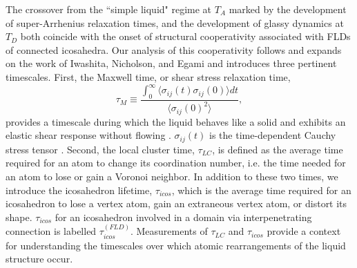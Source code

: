 \documentclass[aps,prl,preprint,showpacs,amsmath,floatfix,superscriptaddress]{revtex4}
\begin{document}
The crossover from the ``simple liquid" regime at $T_{A}$ marked
by the development of super-Arrhenius relaxation times, and the
development of glassy dynamics at $T_{D}$ both coincide with the
onset of structural cooperativity associated with FLDs of
connected icosahedra. Our analysis of this cooperativity follows
and expands on the work of Iwashita, Nicholson, and Egami
\cite{Iwashita2013} and introduces three pertinent timescales.
First, the Maxwell time, or shear stress relaxation time,
\begin{equation}\label{eq:maxwell} \tau_{M} \equiv \frac{ \int_{0}^{\infty} \langle\sigma_{ij}(t)\sigma_{ij}(0)\rangle dt }{\langle\sigma_{ij}(0)^2\rangle}, \end{equation}
provides a timescale during which the liquid behaves like a solid
and exhibits an elastic shear response without flowing
\cite{2009Cavagna,Inoue2008}. $\sigma_{ij}(t)$ is the
time-dependent Cauchy stress tensor \cite{Inoue2008}. Second, the
local cluster time, $\tau_{LC}$, is defined as the average time
required for an atom to change its coordination number, i.e. the
time needed for an atom to lose or gain a Voronoi neighbor. In
addition to these two times, we introduce the icosahedron
lifetime, $\tau_{icos}$, which is the average time required for an
icosahedron to lose a vertex atom, gain an extraneous vertex atom,
or distort its shape. $\tau_{icos}$ for an icosahedron involved in
a domain via interpenetrating connection is labelled
$\tau^{(FLD)}_{icos}$. Measurements of $\tau_{LC}$ and
$\tau_{icos}$ provide a context for understanding the timescales
over which atomic rearrangements of the liquid structure occur.
\end{document}

